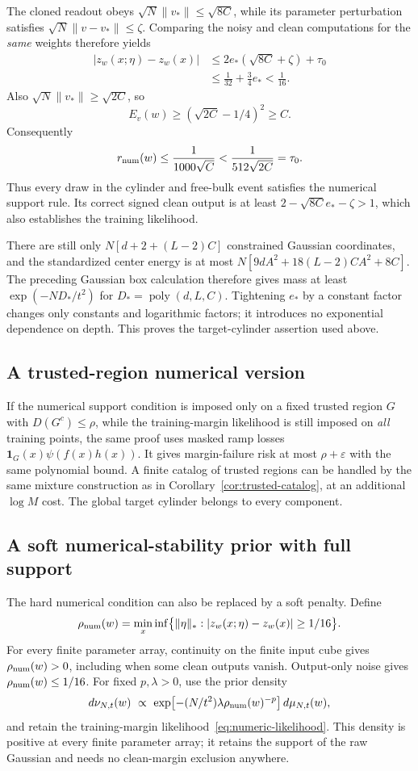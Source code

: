 The cloned readout obeys $\sqrt N\|v_*\|\le\sqrt{8C}$, while its
parameter perturbation satisfies $\sqrt N\|v-v_*\|\le\zeta$.
Comparing the noisy and clean computations for the \emph{same} weights
therefore yields
\begin{align*}
 |z_w(x;\eta)-z_w(x)|
 &\le2e_*(\sqrt{8C}+\zeta)+\tau_0\\
 &\le\frac1{32}+\frac34 e_*<\frac1{16}.
\end{align*}
Also $\sqrt N\|v_*\|\ge\sqrt{2C}$, so
\[
 E_v(w)\ge(\sqrt{2C}-1/4)^2\ge C.
\]
Consequently
\[
 r_{\rm num}(w)\le\frac{1}{1000\sqrt C}
       <\frac1{512\sqrt{2C}}=\tau_0.
\]
Thus every draw in the cylinder and free-bulk event satisfies the numerical
support rule. Its correct signed clean output is at least
$2-\sqrt{8C}e_*-\zeta>1$, which also establishes the training likelihood.

There are still only $N[d+2+(L-2)C]$ constrained Gaussian coordinates,
and the standardized center energy is at most
$N[9dA^2+18(L-2)CA^2+8C]$. The preceding Gaussian box calculation therefore
gives mass at least $\exp(-ND_*/t^2)$ for
$D_*=\operatorname{poly}(d,L,C)$. Tightening $e_*$ by a constant factor
changes only constants and logarithmic factors; it introduces no exponential
dependence on depth. This proves the target-cylinder assertion used above.

\subsection{A trusted-region numerical version}

If the numerical support condition is imposed only on a fixed trusted
region $G$ with $D(G^c)\le\rho$, while the training-margin likelihood is
still imposed on \emph{all} training points, the same proof uses masked
ramp losses $\mathbf1_G(x)\psi(f(x)h(x))$. It gives margin-failure risk
at most $\rho+\varepsilon$ with the same polynomial bound. A finite catalog
of trusted regions can be handled by the same mixture construction as in
Corollary~\ref{cor:trusted-catalog}, at an additional $\log M$ cost.
The global target cylinder belongs to every component.

\subsection{A soft numerical-stability prior with full support}

The hard numerical condition can also be replaced by a soft penalty. Define
\[
 \rho_{\rm num}(w)=\min_x\inf\bigl\{\|\eta\|_*:
       |z_w(x;\eta)-z_w(x)|\ge1/16\bigr\}.
\]
For every finite parameter array, continuity on the finite input cube
gives $\rho_{\rm num}(w)>0$, including when some clean outputs vanish.
Output-only noise gives $\rho_{\rm num}(w)\le1/16$.
For fixed $p,\lambda>0$, use the prior density
\[
 d\nu_{N,t}(w)\ \propto\
       \exp\bigl[-(N/t^2)\lambda\rho_{\rm num}(w)^{-p}\bigr]
       \,d\mu_{N,t}(w),
\]
and retain the training-margin likelihood~\eqref{eq:numeric-likelihood}.
This density is positive at every finite parameter array; it retains the
support of the raw Gaussian and needs no clean-margin exclusion anywhere.

